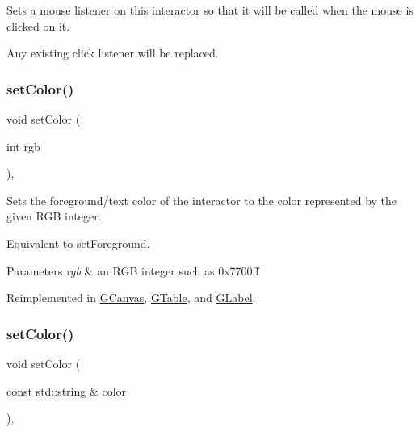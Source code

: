 Sets a mouse listener on this interactor so that it will be called when the mouse is clicked on it. 

Any existing click listener will be replaced. \mbox{\label{classsgl_1_1GInteractor_ab1f5cc0f5cc6bbbd716a526c61f1081d}} 
\subsubsection{\texorpdfstring{set\+Color()}{setColor()}\hspace{0.1cm}{\footnotesize\ttfamily [1/2]}}
{\footnotesize\ttfamily void set\+Color (\begin{DoxyParamCaption}\item[{int}]{rgb }\end{DoxyParamCaption})\hspace{0.3cm}{\ttfamily [virtual]}, {\ttfamily [inherited]}}



Sets the foreground/text color of the interactor to the color represented by the given R\+GB integer. 

Equivalent to set\+Foreground. 
\begin{DoxyParams}{Parameters}
{\em rgb} & an R\+GB integer such as 0x7700ff \\
\hline
\end{DoxyParams}


Reimplemented in \mbox{\hyperlink{classsgl_1_1GCanvas_af6e1bcf23a09a0ae0607daff81ee45fa}{G\+Canvas}}, \mbox{\hyperlink{classsgl_1_1GTable_a165735fb49fa7db12602d32557cbfe0d}{G\+Table}}, and \mbox{\hyperlink{classsgl_1_1GLabel_a165735fb49fa7db12602d32557cbfe0d}{G\+Label}}.

\mbox{\label{classsgl_1_1GInteractor_a61374df6c11b52cfbb0815decdbaebc6}} 
\subsubsection{\texorpdfstring{set\+Color()}{setColor()}\hspace{0.1cm}{\footnotesize\ttfamily [2/2]}}
{\footnotesize\ttfamily void set\+Color (\begin{DoxyParamCaption}\item[{const std\+::string \&}]{color }\end{DoxyParamCaption})\hspace{0.3cm}{\ttfamily [virtual]}, {\ttfamily [inherited]}}



